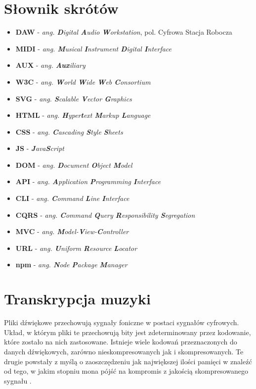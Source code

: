 \documentclass[12pt,a4paper,twoside]{mwart}
\begin{document}
\section{Słownik skrótów}
\begin{itemize}
\item \textbf{DAW} - \textit{ang. \textbf{D}igital \textbf{A}udio \textbf{W}orkstation}, pol. Cyfrowa Stacja Robocza 
\item \textbf{MIDI} - \textit{ang. \textbf{M}usical \textbf{I}nstrument \textbf{D}igital \textbf{I}nterface}
\item \textbf{AUX} - \textit{ang. \textbf{Aux}iliary}
\item \textbf{W3C} - \textit{ang. \textbf{W}orld \textbf{W}ide \textbf{W}eb \textbf{C}onsortium}
\item \textbf{SVG} - \textit{ang. \textbf{S}calable \textbf{V}ector \textbf{G}raphics}
\item \textbf{HTML} - \textit{ang. \textbf{H}yper\textbf{t}ext \textbf{M}arkup \textbf{L}anguage}
\item \textbf{CSS} - \textit{ang.  \textbf{C}ascading \textbf{S}tyle \textbf{S}heets}
\item \textbf{JS} - \textit{\textbf{J}ava\textbf{S}cript}
\item \textbf{DOM} - \textit{ang. \textbf{D}ocument \textbf{O}bject \textbf{M}odel}
\item \textbf{API} - \textit{ang. \textbf{A}pplication \textbf{P}rogramming \textbf{I}nterface}
\item \textbf{CLI} - \textit{ang. \textbf{C}ommand \textbf{L}ine \textbf{I}nterface}
\item \textbf{CQRS} - \textit{ang. \textbf{C}ommand \textbf{Q}uery \textbf{R}esponsibility \textbf{S}egregation}
\item \textbf{MVC} - \textit{ang. \textbf{M}odel-\textbf{V}iew-\textbf{C}ontroller}
\item \textbf{URL} - \textit{ang. \textbf{U}niform \textbf{R}esource \textbf{L}ocator }
\item \textbf{npm} - \textit{ang. \textbf{N}ode \textbf{P}ackage \textbf{M}anager}
  
\end{itemize}
\newpage
\setcounter{secnumdepth}{2}

\section{Transkrypcja muzyki}
Pliki dźwiękowe przechowują sygnały foniczne w postaci sygnałów cyfrowych. Układ, w którym pliki te przechowują bity jest zdeterminowany przez kodowanie, które zostało na nich zastosowane. Istnieje wiele kodowań przeznaczonych do danych dźwiękowych, zarówno nieskompresowanych jak i skompresowanych. Te drugie powstały z myślą o zaoszczędzeniu jak największej ilości pamięci w znaleźć od tego, w jakim stopniu mona pójść na kompromis z jakością skompresowanego sygnału \cite[66]{Homerecording:DlaKazdego}.
\end{document}
